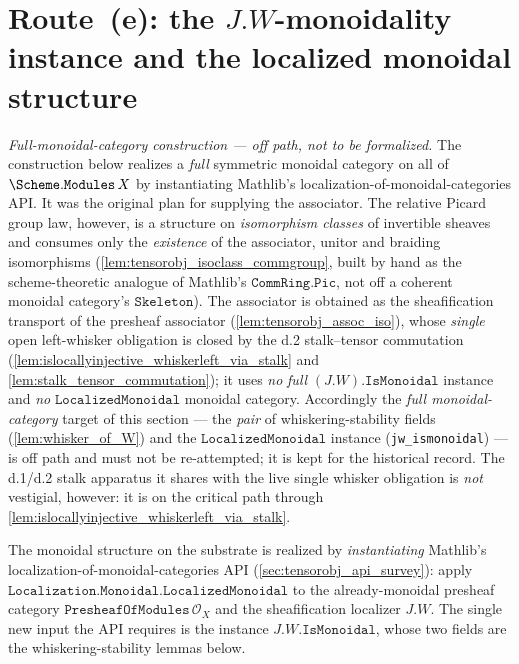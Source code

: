 \section{Route~(e): the \(J.W\)-monoidality instance and the localized monoidal structure}
\label{sec:tensorobj_route_e}

\emph{Full-monoidal-category construction --- off path, not to be formalized.} The
construction below realizes a \emph{full} symmetric monoidal category on all of
\(\Scheme.\mathtt{Modules}\,X\) by instantiating Mathlib's
localization-of-monoidal-categories API. It was the original plan for supplying the
associator. The relative Picard group law, however, is a structure on
\emph{isomorphism classes} of invertible sheaves and consumes only the
\emph{existence} of the associator, unitor and braiding isomorphisms
(\cref{lem:tensorobj_isoclass_commgroup}, built by hand as the scheme-theoretic
analogue of Mathlib's \(\mathtt{CommRing.Pic}\), not off a coherent monoidal
category's \(\mathtt{Skeleton}\)). The associator is obtained as the sheafification
transport of the presheaf associator (\cref{lem:tensorobj_assoc_iso}), whose
\emph{single} open left-whisker obligation is closed by the d.2 stalk--tensor
commutation (\cref{lem:islocallyinjective_whiskerleft_via_stalk} and
\cref{lem:stalk_tensor_commutation}); it uses \emph{no} \emph{full}
\((J.W).\mathtt{IsMonoidal}\) instance and \emph{no} \(\mathtt{LocalizedMonoidal}\)
monoidal category. Accordingly the \emph{full monoidal-category} target of this
section --- the \emph{pair} of whiskering-stability fields (\cref{lem:whisker_of_W})
and the \(\mathtt{LocalizedMonoidal}\) instance (\texttt{jw\_ismonoidal}) --- is off
path and must not be re-attempted; it is kept for the historical record. The d.1/d.2
stalk apparatus it shares with the live single whisker obligation is \emph{not}
vestigial, however: it is on the critical path through
\cref{lem:islocallyinjective_whiskerleft_via_stalk}.

The monoidal structure on the substrate is realized by \emph{instantiating}
Mathlib's localization-of-monoidal-categories API
(\cref{sec:tensorobj_api_survey}): apply
\(\mathtt{Localization.Monoidal.LocalizedMonoidal}\) to the already-monoidal
presheaf category \(\mathtt{PresheafOfModules}\,\mathcal{O}_X\) and the
sheafification localizer \(J.W\). The single new input the API requires is the
instance \(J.W.\mathtt{IsMonoidal}\), whose two fields are the
whiskering-stability lemmas below.


